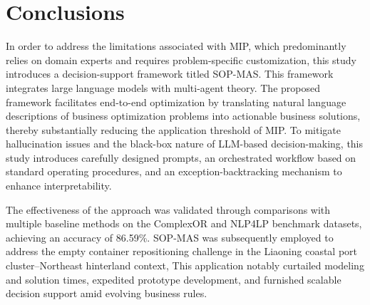 \documentclass[preprint,12pt]{elsarticle}
\begin{document}
\section{Conclusions}

In order to address the limitations associated with MIP, which predominantly relies on domain experts and requires problem-specific customization, this study introduces a decision-support framework titled SOP-MAS. This framework integrates large language models with multi-agent theory. The proposed framework facilitates end-to-end optimization by translating natural language descriptions of business optimization problems into actionable business solutions, thereby substantially reducing the application threshold of MIP. To mitigate hallucination issues and the black-box nature of LLM-based decision-making, this study introduces carefully designed prompts, an orchestrated workflow based on standard operating procedures, and an exception-backtracking mechanism to enhance interpretability.

The effectiveness of the approach was validated through comparisons with multiple baseline methods on the ComplexOR and NLP4LP benchmark datasets, achieving an accuracy of 86.59\%. SOP-MAS was subsequently employed to address the empty container repositioning challenge in the Liaoning coastal port cluster–Northeast hinterland context,  This application notably curtailed modeling and solution times, expedited prototype development, and furnished scalable decision support amid evolving business rules.
\end{document}
